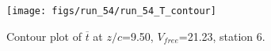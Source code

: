 \begin{figure}[H]
\centering
\texttt{[image: figs/run\_54/run\_54\_T\_contour]}
\caption{Contour plot of $\overline{t}$ at $z/c$=9.50, $V_{free}$=21.23, station 6.}
\label{fig:run_54_T_contour}
\end{figure}


